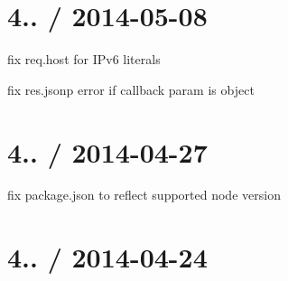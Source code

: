 \section*{4.. / 2014-\/05-\/08 }


\begin{DoxyItemize}
\item fix {\ttfamily req.\+host} for I\+Pv6 literals
\item fix {\ttfamily res.\+jsonp} error if callback param is object
\end{DoxyItemize}

\section*{4.. / 2014-\/04-\/27 }


\begin{DoxyItemize}
\item fix package.\+json to reflect supported node version
\end{DoxyItemize}

\section*{4.. / 2014-\/04-\/24 }


